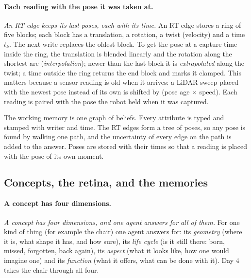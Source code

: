 \documentclass[11pt]{article}
\newcommand{\slt}[1]{\emph{#1}}   %
\begin{document}
\paragraph{Each reading with the pose it was taken at.} \slt{An RT edge keeps its last poses, each with its time.} An RT edge stores a ring of five blocks; each block has a translation, a rotation, a twist (velocity) and a time $t_k$. The next write replaces the oldest block. To get the pose at a capture time inside the ring, the translation is blended linearly and the rotation along the shortest arc (\emph{interpolation}); newer than the last block it is \emph{extrapolated} along the twist; a time outside the ring returns the end block and marks it clamped. This matters because a sensor reading is old when it arrives: a LiDAR sweep placed with the newest pose instead of its own is shifted by (pose age $\times$ speed). Each reading is paired with the pose the robot held when it was captured.

\begin{keyidea}
The working memory is one graph of beliefs. Every attribute is typed and stamped with writer and time. The RT edges form a tree of poses, so any pose is found by walking one path, and the uncertainty of every edge on the path is added to the answer. Poses are stored with their times so that a reading is placed with the pose of its own moment.
\end{keyidea}

\subsection{Concepts, the retina, and the memories}

\paragraph{A concept has four dimensions.} \slt{A concept has four dimensions, and one agent answers for all of them.} For one kind of thing (for example the chair) one agent answers for: its \emph{geometry} (where it is, what shape it has, and how sure), its \emph{life cycle} (is it still there: born, missed, forgotten, back again), its \emph{aspect} (what it looks like, how one would imagine one) and its \emph{function} (what it offers, what can be done with it). Day 4 takes the chair through all four.
\end{document}
